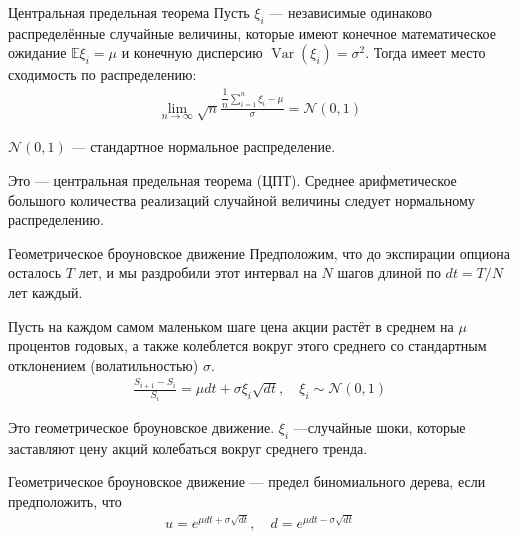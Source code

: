 \documentclass{beamer}
\begin{document}
\begin{frame}{Центральная предельная теорема}
\justify
Пусть $\xi_i$ --- независимые одинаково распределённые случайные величины, которые имеют конечное математическое ожидание $\mathbb{E}\xi_i=\mu$ и конечную дисперсию $\operatorname{Var}(\xi_i) = \sigma^2$. Тогда имеет место сходимость по распределению:
\begin{align*}
\lim_{n \to \infty} \sqrt{n}\frac{\dfrac{1}{n}\sum\limits_{i=1}^{n}\xi_i - \mu}{\sigma} = \mathcal{N}(0, 1)
\end{align*}

\justify
$\mathcal{N}(0, 1)$ --- стандартное нормальное распределение.

\justify
Это --- центральная предельная теорема (ЦПТ). Среднее арифметическое большого количества реализаций случайной величины следует нормальному распределению.
\end{frame}



\begin{frame}{Геометрическое броуновское движение}
\justify
Предположим, что до экспирации опциона осталось $T$ лет, и мы раздробили этот интервал на $N$ шагов длиной по $dt = T/N$ лет каждый.

\justify
Пусть на каждом самом маленьком шаге цена акции растёт в среднем на $
\mu$ процентов годовых, а также колеблется вокруг этого среднего со 
стандартным отклонением (волатильностью) $\sigma$.
\begin{align*}
\frac{S_{i+1} - S_i}{S_i} = \mu dt + \sigma\xi_i\sqrt{dt}, \quad \xi_i \sim \mathcal{N}(0, 1)
\end{align*}

\justify
Это геометрическое броуновское движение. $\xi_i$ ---случайные шоки, которые заставляют цену акций колебаться вокруг среднего тренда. 

\justify
Геометрическое броуновское движение --- предел биномиального дерева, если предположить, что
\begin{align*}
u = e^{\mu dt + \sigma\sqrt{dt}}, \quad d = e^{\mu dt - \sigma\sqrt{dt}}
\end{align*}
\end{frame}



\newcommand{\plotBrownianMotion}[2] {
	
	\addplot[
		color = #2,
		mark = none,
		thick
	]
	table[
		x=t,
		y=s,
		col sep=comma
	]
	{#1};
	
	\addplot[
		color = #2,
		mark = none,
		thick,
		dashed,
		forget plot
	] 
	table[
		x=t,
		y=trend,
		col sep=comma
	]
	{#1};
}
\end{document}
